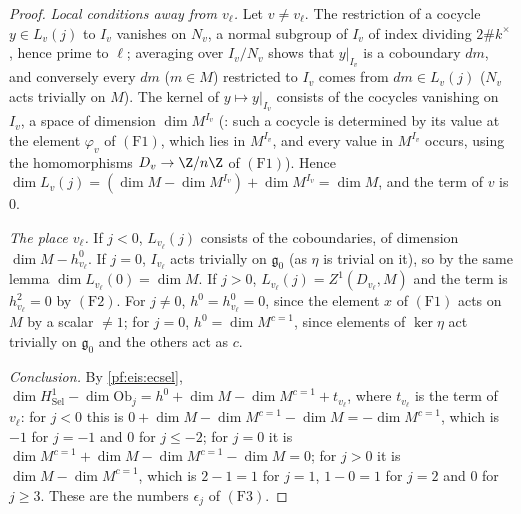 \begin{proof}
\emph{Local conditions away from $v_\ell$.} Let $v\ne v_\ell$. The restriction of a cocycle $y\in L_v(j)$ to $I_v$ vanishes on $N_v$, a normal
subgroup of $I_v$ of index dividing $2\#k^\times$, hence prime to $\ell$; averaging over $I_v/N_v$ shows that $y|_{I_v}$ is a coboundary
$dm$, and conversely every $dm$ ($m\in M$) restricted to $I_v$ comes from $dm\in L_v(j)$ ($N_v$ acts trivially on $M$). The kernel of $y\mapsto y|_{I_v}$
consists of the cocycles vanishing on $I_v$, a space of dimension $\dim M^{I_v}$
(: such a cocycle is determined by its value at the element
$\varphi_v$ of $(\mathrm{F1})$, which lies in $M^{I_v}$, and every value in $M^{I_v}$ occurs, using the homomorphisms $D_v\to\Z/n\Z$ of
$(\mathrm{F1})$). Hence $\dim L_v(j)=(\dim M-\dim M^{I_v})+\dim M^{I_v}=\dim M$, and the term of $v$ is $0$.

\emph{The place $v_\ell$.} If $j<0$, $L_{v_\ell}(j)$ consists of the coboundaries, of dimension $\dim M-h^0_{v_\ell}$. If $j=0$, $I_{v_\ell}$ acts
trivially on $\mathfrak g_0$ (as $\eta$ is trivial on it), so by the same lemma $\dim L_{v_\ell}(0)=\dim M$. If $j>0$, $L_{v_\ell}(j)=Z^1(D_{v_\ell},M)$
and the term is $h^2_{v_\ell}=0$ by $(\mathrm{F2})$. For $j\ne0$, $h^0=h^0_{v_\ell}=0$, since the element $x$ of $(\mathrm{F1})$ acts on $M$ by a
scalar $\ne1$; for $j=0$, $h^0=\dim M^{c=1}$, since elements of $\ker\eta$ act trivially on $\mathfrak g_0$ and the others act as $c$.

\emph{Conclusion.} By \cref{pf:eis:ecsel}, $\dim H^1_{\mathrm{Sel}}-\dim\mathrm{Ob}_j=h^0+\dim M-\dim M^{c=1}+t_{v_\ell}$, where $t_{v_\ell}$ is the term of $v_\ell$:
for $j<0$ this is $0+\dim M-\dim M^{c=1}-\dim M=-\dim M^{c=1}$, which is $-1$ for $j=-1$ and $0$ for $j\le-2$; for $j=0$ it is
$\dim M^{c=1}+\dim M-\dim M^{c=1}-\dim M=0$; for $j>0$ it is $\dim M-\dim M^{c=1}$, which is $2-1=1$ for $j=1$, $1-0=1$ for $j=2$ and $0$ for
$j\ge3$. These are the numbers $\epsilon_j$ of $(\mathrm{F3})$.
\end{proof}

